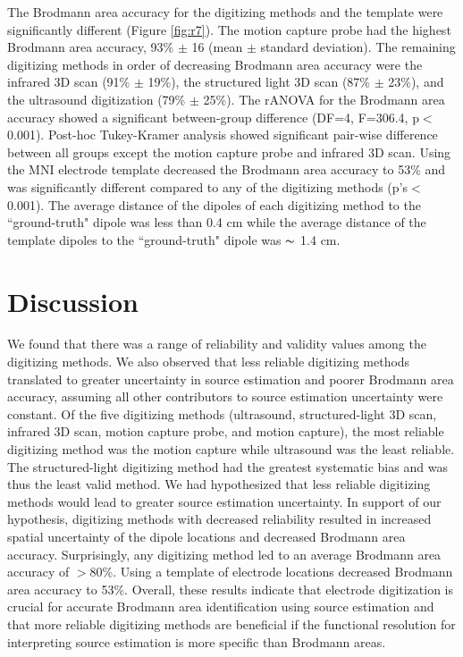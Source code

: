 \documentclass{UCF_ETD}
\renewcommand{\ul}{}
\begin{document}
The Brodmann area accuracy for the digitizing methods and the template were significantly different (Figure \ref{fig:r7}). The motion capture probe had the highest Brodmann area accuracy, 93\% $\pm$ 16 (mean $\pm$ standard deviation). The remaining digitizing methods in order of decreasing Brodmann area accuracy were the infrared 3D scan (91\% $\pm$ 19\%), the structured light 3D scan (87\% $\pm$ 23\%), and the ultrasound digitization (79\% $\pm$ 25\%). The rANOVA for the Brodmann area accuracy showed a significant between-group difference (\ul{DF=4, F=306.4,} p$<$0.001). Post-hoc Tukey-Kramer analysis showed significant pair-wise difference between all groups except the motion capture probe and infrared 3D scan. Using the MNI electrode template decreased the Brodmann area accuracy to 53\% and was significantly different compared to any of the digitizing methods (p's$<$0.001). The average distance of the dipoles of each digitizing method to the ``ground-truth" dipole was less than 0.4 cm while the average distance of the template dipoles to the ``ground-truth" dipole was $\thicksim$ 1.4 cm. 

\section{Discussion}

We found that there was a range of reliability and validity values among the digitizing methods. \ul{We also observed} that less reliable digitizing methods translated to greater uncertainty in source estimation and poorer Brodmann area accuracy, assuming all other contributors to source estimation uncertainty were constant. Of the five digitizing methods (ultrasound, structured-light 3D scan, infrared 3D scan, motion capture probe, and motion capture), the most reliable digitizing method was the motion capture while ultrasound was the least reliable. The structured-light digitizing method had the greatest systematic bias and was thus the least valid method. We had hypothesized that less reliable digitizing methods would lead to greater source estimation uncertainty. In support of our hypothesis, digitizing methods with decreased reliability resulted in increased spatial uncertainty of the dipole locations and decreased Brodmann area accuracy. Surprisingly, any digitizing method led to an average Brodmann area accuracy of $>$80\%. Using a template of electrode locations decreased Brodmann area accuracy to 53\%. Overall, these results indicate that electrode digitization is crucial for accurate Brodmann area identification using source estimation and that more reliable digitizing methods are beneficial if the functional resolution for interpreting source estimation is more specific than Brodmann areas.
\end{document}
